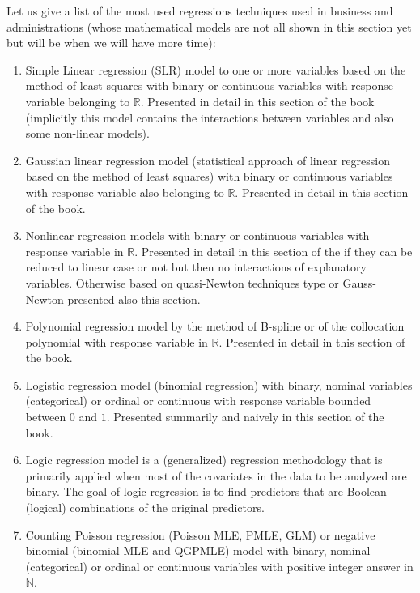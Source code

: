 	Let us give a list of the most used regressions techniques used in business and administrations (whose mathematical models are not all shown in this section yet but will be when we will have more time):
	\begin{enumerate}
		\item Simple Linear regression (SLR) model to one or more variables based on the method of least squares with binary or continuous variables with response variable belonging to $\mathbb{R}$. Presented in detail in this section of the book (implicitly this model contains the interactions between variables and also some non-linear models).
		
		\item Gaussian linear regression model (statistical approach of linear regression based on the method of least squares) with binary or  continuous variables with response variable also belonging to $\mathbb{R}$. Presented in detail in this section of the book.
		
		\item Nonlinear regression models with binary or continuous variables with response variable in $\mathbb{R}$. Presented in detail in this section of the if they can be reduced to linear case or not but then no interactions of explanatory variables. Otherwise based on quasi-Newton techniques type or Gauss-Newton presented also this section.
		
		\item Polynomial regression model by the method of B-spline or of the collocation polynomial with response variable in $\mathbb{R}$. Presented in detail in this section of the book.
		
		\item Logistic regression model (binomial regression) with binary, nominal variables (categorical) or ordinal or continuous with response variable bounded between $0$ and $1$. Presented summarily and naively in this section of the book.
		
		\item Logic regression model is a (generalized) regression methodology that is primarily applied when most of the covariates in the data to be analyzed are binary. The goal of logic regression is to find predictors that are Boolean (logical) combinations of the original predictors. 
		
		\item Counting Poisson regression (Poisson MLE, PMLE, GLM) or negative binomial (binomial MLE and QGPMLE) model with binary, nominal (categorical) or ordinal or continuous variables with positive integer answer in $\mathbb{N}$.
		

\end{enumerate}
